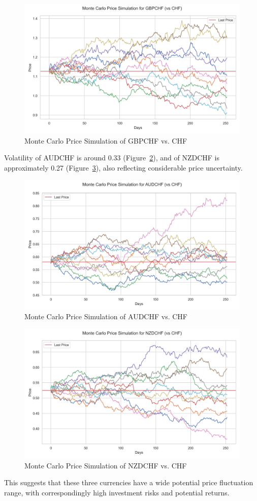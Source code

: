 \documentclass{article}
\begin{document}
\begin{figure}[h]
    \centering  \includegraphics[width=0.75\linewidth]{reports/figures/monte_carlo_price_simulation_GBPCHF_vs_CHF.png}
    \caption{Monte Carlo Price Simulation of GBPCHF vs. CHF}  \label{fig:monte_carlo_price_simulation_GBPCHF_vs_CHF}
\end{figure}

Volatility of AUDCHF is around 0.33 (Figure~\ref{fig:monte_carlo_price_simulation_AUDCHF_vs_CHF}), and of NZDCHF is approximately 0.27 (Figure~\ref{fig:monte_carlo_price_simulation_NZDCHF_vs_CHF}), also reflecting considerable price uncertainty. 

\begin{figure}[h]
    \centering \includegraphics[width=0.75\linewidth]{reports/figures/monte_carlo_price_simulation_AUDCHF_vs_CHF.png}
    \caption{Monte Carlo Price Simulation of AUDCHF vs. CHF} \label{fig:monte_carlo_price_simulation_AUDCHF_vs_CHF}
\end{figure}

\begin{figure}[h]
    \centering  \includegraphics[width=0.75\linewidth]{reports/figures/monte_carlo_price_simulation_NZDCHF_vs_CHF.png}
    \caption{Monte Carlo Price Simulation of NZDCHF vs. CHF} \label{fig:monte_carlo_price_simulation_NZDCHF_vs_CHF}
\end{figure}
This suggests that these three currencies have a wide potential price fluctuation range, with correspondingly high investment risks and potential returns.
\end{document}
